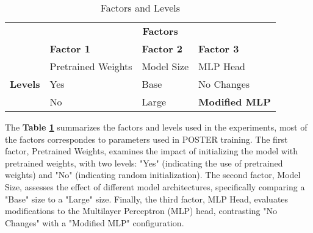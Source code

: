 \begin{table}[H]
\centering
\caption{Factors and Levels}
\label{tab:factors_and_levels}
\begin{tabular}{clll}
\hline
\multicolumn{1}{l}{}             & \multicolumn{3}{c}{\textbf{Factors}}                       \\
\multicolumn{1}{l}{}             & \textbf{Factor 1}  & \textbf{Factor 2} & \textbf{Factor 3} \\ \hline
\multirow{3}{*}{\textbf{Levels}} & Pretrained Weights & Model Size        & MLP Head          \\
                                 & Yes                & Base              & No Changes        \\
                                 & No                 & Large             & \textbf{Modified MLP}      \\ \hline
\end{tabular}
\end{table}



The \textbf{Table \ref{tab:factors_and_levels}} summarizes the factors and levels used in the experiments, most of the factors correspondes to parameters used in  POSTER \cite{zheng_poster_2022} training.  The first factor, Pretrained Weights, examines the impact of initializing the model with pretrained weights, with two levels: "Yes" (indicating the use of pretrained weights) and "No" (indicating random initialization). The second factor, Model Size, assesses the effect of different model architectures, specifically comparing a "Base" size to a "Large" size. Finally, the third factor, MLP Head, evaluates modifications to the Multilayer Perceptron (MLP) head, contrasting "No Changes" with a "Modified MLP" configuration. 




